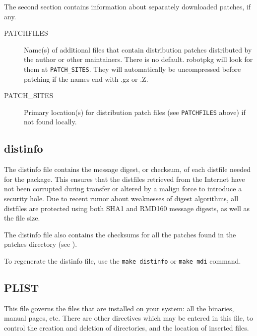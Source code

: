 The second section contains information about separately downloaded patches, if any.

\begin{description}

   \item[PATCHFILES] Name(s) of additional files that contain distribution
   patches distributed by the author or other maintainers. There is no
   default. robotpkg will look for them at {\tt    PATCH\_SITES}. They will
   automatically be uncompressed before patching if    the names end with .gz
   or .Z.

   \item[PATCH\_SITES] Primary location(s) for distribution patch files (see
   {\tt PATCHFILES} above) if not found locally.

\end{description}


\subsection{distinfo} %
\label{subsection:distinfo}

The distinfo file contains the message digest, or checksum, of each distfile
needed for the package. This ensures that the distfiles retrieved from the
Internet have not been corrupted during transfer or altered by a malign force
to introduce a security hole. Due to recent rumor about weaknesses of digest
algorithms, all distfiles are protected using both SHA1 and RMD160 message
digests, as well as the file size.

The distinfo file also contains the checksums for all the patches found in the
patches directory (see
).

To regenerate the distinfo file, use the {\tt make distinfo} or {\tt make mdi}
command.


\subsection{PLIST}
\label{subsection:PLIST}

This  file  governs the  files  that  are installed  on  your  system: all  the
binaries, manual pages, etc. There are other directives which may be entered in
this  file,  to control  the  creation and  deletion  of  directories, and  the
location of inserted files.


